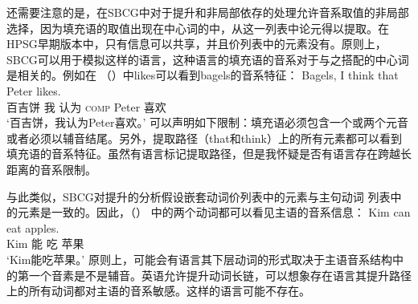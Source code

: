 还需要注意的是，在SBCG中对于提升和非局部依存的处理允许音系取值的非局部选择，因为填充语的\formvc 取值出现在中心词的\argstlc 中，从这一列表中论元得以提取。在HPSG早期版本中，只有\localc 信息可以共享，并且价列表中的元素没有\phonfc。原则上，SBCG可以用于模拟这样的语言，这种语言的填充语的音系对于与之搭配的中心词是相关的。例如在 （）中likes可以看到bagels的音系特征：
\ea
\gll Bagels, I think that Peter likes.\\
     百吉饼 我 认为 \textsc{comp} Peter 喜欢\\
\glt `百吉饼，我认为Peter喜欢。'
\z
可以声明如下限制：填充语必须包含一个或两个元音或者必须以辅音结尾。另外，提取路径（that和think）上的所有元素都可以看到填充语的音系特征。虽然有语言标记提取路径，但是我怀疑是否有语言存在跨越长距离的音系限制。

与此类似，SBCG对提升的分析假设嵌套动词价列表中的元素与主句动词 \argstlc 列表中的元素是一致的\citep[]{Sag2012a}。因此，（） 中的两个动词都可以看见主语的音系信息：
\ea
\gll Kim can eat apples.\\
     Kim 能 吃 苹果\\
\glt `Kim能吃苹果。'
\z
原则上，可能会有语言其下层动词的形式取决于主语音系结构中的第一个音素是不是辅音。英语允许提升动词长链，可以想象存在语言其提升路径上的所有动词都对主语的音系敏感。这样的语言可能不存在。

